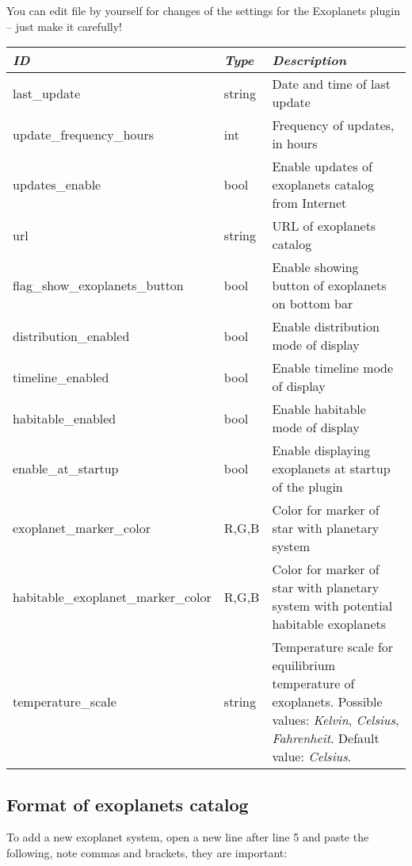 You can edit  file by yourself for changes of the
settings for the Exoplanets plugin -- just make it carefully!

\noindent%
\begin{tabularx}{\textwidth}{l|l|X}\toprule
\emph{ID}               & \emph{Type} & \emph{Description}\\\midrule
last\_update                 & string & Date and time of last update \\\midrule
update\_frequency\_hours       & int  & Frequency of updates, in hours \\\midrule
updates\_enable                & bool & Enable updates of exoplanets catalog from Internet \\\midrule
url                          & string & URL of exoplanets catalog \\\midrule
flag\_show\_exoplanets\_button & bool & Enable showing button of exoplanets on bottom bar \\\midrule
distribution\_enabled          & bool & Enable distribution mode of display \\\midrule
timeline\_enabled              & bool & Enable timeline mode of display \\\midrule
habitable\_enabled             & bool & Enable habitable mode of display \\\midrule
enable\_at\_startup            & bool & Enable displaying exoplanets at startup of the plugin \\\midrule
exoplanet\_marker\_color      & R,G,B & Color for marker of star with planetary system \\\midrule
habitable\_exoplanet\_marker\_color & R,G,B & Color for marker of star with planetary system with potential habitable exoplanets\\\midrule
temperature\_scale           & string & Temperature scale for equilibrium temperature of exoplanets. 
                                        Possible values: \emph{Kelvin}, \emph{Celsius}, \emph{Fahrenheit}. Default value: \emph{Celsius}. \\\bottomrule
\end{tabularx}

\newpage
\subsection{Format of exoplanets catalog}
\label{sec:plugins:Exoplanets:format}

To add a new exoplanet system, open a new line after line 5 and paste the following, note commas and brackets, they are important:

